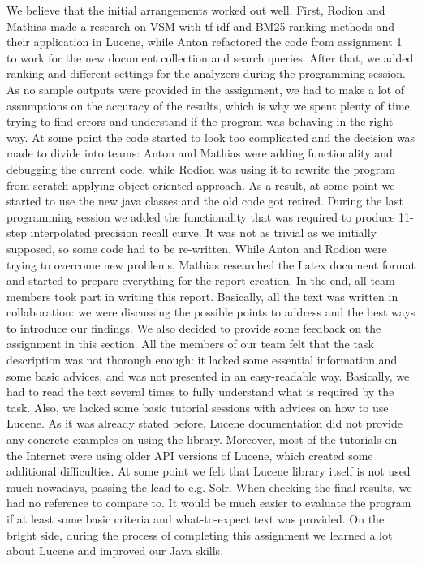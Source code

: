 \documentclass[parskip=full]{aaltoseries}
\begin{document}
We believe that the initial arrangements worked out well. First, Rodion and Mathias made a research on VSM with tf-idf and BM25 ranking methods and their application in Lucene, while Anton refactored the code from assignment 1 to work for the new document collection and search queries. After that, we added ranking and different settings for the analyzers during the programming session. 
As no sample outputs were provided in the assignment, we had to make a lot of assumptions on the accuracy of the results, which is why we spent plenty of time trying to find errors and understand if the program was behaving in the right way. At some point the code started to look too complicated and the decision was made to divide into teams: Anton and Mathias were adding functionality and debugging the current code, while Rodion was using it to rewrite the program from scratch applying object-oriented approach. As a result, at some point we started to use the new java classes and the old code got retired. \newline During the last programming session we added the functionality that was required to produce 11-step interpolated precision recall curve. It was not as trivial as we initially supposed, so some code had to be re-written. While Anton and Rodion were trying to overcome new problems, Mathias researched the Latex document format and started to prepare everything for the report creation. \newline In the end, all team members took part in writing this report. Basically, all the text was written in collaboration: we were discussing the possible points to address and the best ways to introduce our findings. \newline We also decided to provide some feedback on the assignment in this section. All the members of our team felt that the task description was not thorough enough: it lacked some essential information and some basic advices, and was not presented in an easy-readable way. Basically, we had to read the text several times to fully understand what is required by the task.  \newline Also, we lacked some basic tutorial sessions with advices on how to use Lucene. As it was already stated before, Lucene documentation did not provide any concrete examples on using the library. Moreover, most of the tutorials on the Internet were using older API versions of Lucene, which created some additional difficulties. At some point we felt that Lucene library itself is not used much nowadays, passing the lead to e.g. Solr.
When checking the final results, we had no reference to compare to. It would be much easier to evaluate the program if at least some basic criteria and what-to-expect text was provided. On the bright side, during the process of completing this assignment we learned a lot about Lucene and improved our Java skills. 
\end{document}
